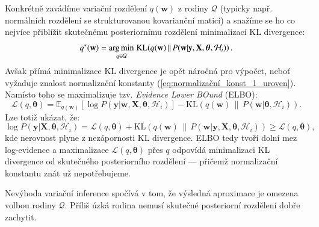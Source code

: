 Konkrétně zavádíme variační rozdělení $q(\mathbf{w})$ z rodiny $\mathcal{Q}$ (typicky např. normálních rozdělení se strukturovanou kovarianční maticí) a snažíme se ho co nejvíce přiblížit skutečnému posteriornímu rozdělení minimalizací KL divergence:
\begin{equation}
  q^*(\mathbf{w}) = \underset{q \in \mathcal{Q}}{\operatorname*{arg\,min}}\; \mathrm{KL}\!\left(q(\mathbf{w}) \,\|\, P(\mathbf{w} | \mathbf{y}, \mathbf{X}, \boldsymbol{\theta}, \mathcal{H}_i)\right).
\end{equation}
Avšak přímá minimalizace KL divergence je opět náročná pro výpočet, neboť vyžaduje znalost normalizační konstanty (\ref{eq:normalizační_konst_1_uroven}).
Namísto toho se maximalizuje tzv. \textit{Evidence Lower BOund} (ELBO):
\begin{equation}
  \mathcal{L}(q, \boldsymbol{\theta}) = \mathbb{E}_{q(\mathbf{w})}\!\left[\log P(\mathbf{y} | \mathbf{w}, \mathbf{X}, \boldsymbol{\theta}, \mathcal{H}_i)\right] - \mathrm{KL}\!\left(q(\mathbf{w}) \,\|\, P(\mathbf{w} | \boldsymbol{\theta}, \mathcal{H}_i)\right).
  \label{eq:elbo}
\end{equation}
Lze totiž ukázat, že:
\begin{equation}
  \log P(\mathbf{y} | \mathbf{X}, \boldsymbol{\theta}, \mathcal{H}_i) = \mathcal{L}(q, \boldsymbol{\theta}) + \mathrm{KL}\!\left(q(\mathbf{w}) \,\|\, P(\mathbf{w} | \mathbf{y}, \mathbf{X}, \boldsymbol{\theta}, \mathcal{H}_i)\right) \geq \mathcal{L}(q, \boldsymbol{\theta}),
  \label{eq:elbo_dekompozice}
\end{equation}
kde nerovnost plyne z nezápornosti KL divergence.
ELBO tedy tvoří dolní mez log-evidence a maximalizace $\mathcal{L}(q, \boldsymbol{\theta})$ přes $q$ odpovídá minimalizaci KL divergence od skutečného posteriorního rozdělení — přičemž normalizační konstantu znát už nepotřebujeme.
\par

Nevýhoda variační inference spočívá v tom, že výsledná aproximace je omezena volbou rodiny $\mathcal{Q}$. 
Příliš úzká rodina nemusí skutečné posteriorní rozdělení dobře zachytit.


